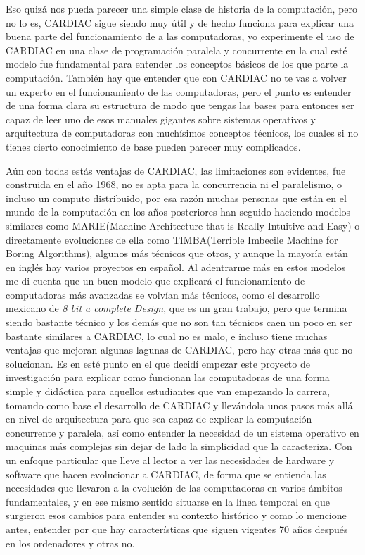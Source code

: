 \documentclass[letterpaper,12pt,oneside]{book}
\begin{document}
	Eso quizá nos pueda parecer una simple clase de historia de la computación, pero no lo es, CARDIAC sigue siendo muy útil y de hecho
	funciona para explicar una buena parte del funcionamiento de a las computadoras, yo experimente el uso de CARDIAC en una clase de programación paralela y concurrente en la 
	cual esté modelo
	fue fundamental para entender los conceptos básicos de los que parte la computación. También hay que entender que con CARDIAC no te vas a volver un experto en 
	el funcionamiento de las computadoras,
	pero el punto es entender de una forma clara su estructura de modo que tengas las bases para entonces ser capaz de leer uno de esos manuales gigantes sobre sistemas
	operativos y arquitectura de computadoras con muchísimos conceptos técnicos, los cuales si no tienes cierto conocimiento de base pueden
	parecer muy complicados.
	
	Aún con todas estás ventajas de CARDIAC, las limitaciones son evidentes, fue construida en el año 1968, no es apta para la concurrencia ni el paralelismo, o 
	incluso un computo distribuido, por esa razón muchas personas que están en el mundo de la computación en los años posteriores han seguido haciendo
	modelos similares como MARIE(Machine Architecture that is Really Intuitive and Easy) o directamente evoluciones de ella como TIMBA(Terrible Imbecile Machine for Boring 
	Algorithms), algunos más técnicos que otros, y aunque la mayoría están en inglés hay varios proyectos en español. 
	Al adentrarme más en estos modelos me di cuenta que un buen modelo que explicará el funcionamiento de computadoras más avanzadas se volvían más técnicos, como el 
	desarrollo mexicano de \textit{8 bit a complete Design}, 
	que es un gran trabajo, pero que termina siendo bastante técnico y los demás que no son tan técnicos caen un poco en ser bastante similares a CARDIAC, lo cual no 
	es malo, e incluso tiene muchas ventajas que mejoran algunas lagunas de CARDIAC, pero hay otras más que no solucionan. Es en esté punto en el que decidí empezar este
	proyecto de investigación para explicar como funcionan las computadoras de una forma simple y didáctica para aquellos estudiantes que van empezando la carrera,
	tomando como base el  desarrollo de CARDIAC y llevándola unos pasos más allá en nivel de arquitectura para que sea capaz de explicar
	la computación concurrente y paralela, así como entender la necesidad de un sistema operativo en maquinas más complejas sin dejar de lado la simplicidad que la 
	caracteriza.
	Con un enfoque particular que lleve al lector a ver las necesidades de hardware y software que hacen evolucionar a CARDIAC,
	de forma que se entienda las necesidades que llevaron a la evolución de las computadoras en varios ámbitos fundamentales, y en ese mismo sentido situarse en la línea
	temporal en que surgieron esos cambios para entender su contexto histórico y como lo mencione antes, entender por que hay características  que siguen vigentes
	70 años después en los ordenadores y otras no.
	
\end{document}
